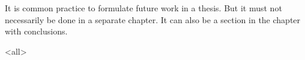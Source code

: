 \label{ch:futurework}

\begin{explanation}
    It is common practice to formulate future work in a thesis. But it must not necessarily be done in a separate chapter. It can also be a section in the chapter with conclusions.
\end{explanation}

\mode<all> %
